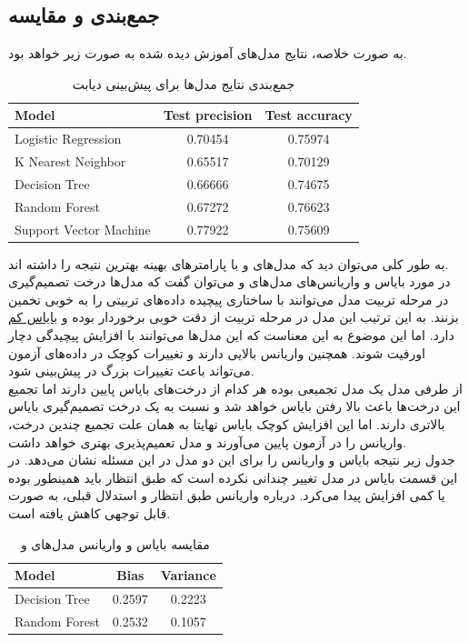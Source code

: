 \documentclass[11pt]{article}
\begin{document}
	\subsection{جمع‌بندی و مقایسه}
	به صورت خلاصه، نتایج مدل‌های آموزش دیده شده به صورت زیر خواهد بود.
			\begin{table}[h!]
		\caption{جمع‌بندی نتایج مدل‌ها برای پیش‌بینی دیابت}
		\begin{latin}
			\centering
			\begin{tabular}{|l|c|c|}
				\hline
				\textbf{Model} & \textbf{Test precision} & \textbf{Test accuracy} \\ \hline
				Logistic Regression & 0.70454 & 0.75974 \\ \hline
				K Nearest Neighbor & 0.65517 & 0.70129 \\ \hline
				Decision Tree & 0.66666 &  0.74675 \\ \hline
				Random Forest & 0.67272 & 0.76623 \\ \hline
				Support Vector Machine & 0.77922 & 0.75609 \\ \hline
			\end{tabular}
		\end{latin}
		\label{tab:results2} 
		\end{table}
		به طور کلی می‌توان دید که مدل‌های  و  با پارامتر‌های بهینه بهترین نتیجه را داشته اند.\\
		در مورد بایاس و واریانس‌های مدل‌های  و  می‌توان گفت که مدل‌ها درخت تصمیم‌گیری در مرحله تربیت مدل می‌توانند با ساختاری پیچیده داده‌های تربیتی را به خوبی تخمین بزنند. به این ترتیب این مدل در مرحله تربیت از دقت خوبی برخوردار بوده و \underline{بایاس کم} دارد. اما این موضوع به این معناست که این مدل‌ها می‌توانند با افزایش پیچیدگی دچار اورفیت شوند. همچنین واریانس بالایی دارند و تغییرات کوچک در داده‌های آزمون می‌تواند باعث تغییرات بزرگ در پیش‌بینی شود.\\
		از طرفی مدل‌
		یک مدل تجمیعی بوده هر کدام از درخت‌های بایاس پایین دارند اما تجمیع این درخت‌ها باعث بالا رفتن بایاس خواهد شد و نسبت به یک درخت تصمیم‌گیری بایاس بالاتری دارند. اما این افزایش کوچک بایاس نهایتا به همان علت تجمیع چندین درخت، واریانس را در آزمون پایین می‌آورند و مدل تعمیم‌پذیری بهتری خواهد داشت.\\
		جدول زیر نتیجه بایاس و واریانس را برای این دو مدل در این مسئله نشان می‌دهد. در این قسمت بایاس در مدل  تغییر چندانی نکرده است که طبق انتظار باید همینطور بوده یا کمی افزایش پیدا می‌کرد. درباره واریانس طبق انتظار و استدلال قبلی، به صورت قابل توجهی کاهش یافته است.
				\begin{table}[h!]
		\caption{مقایسه بایاس و واریانس مدل‌های  و }
		\begin{latin}
			\centering
			\begin{tabular}{|l|c|c|}
				\hline
				\textbf{Model} & \textbf{Bias} & \textbf{Variance} \\ \hline
				Decision Tree & 0.2597 & 0.2223 \\ \hline
				Random Forest & 0.2532 & 0.1057 \\ \hline
			\end{tabular}
		\end{latin}
		\label{tab:results3} 
	\end{table}
	
\end{document}
